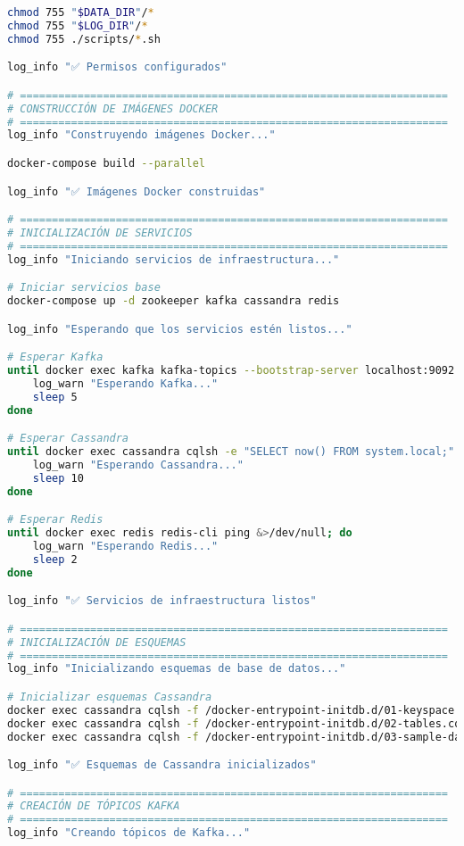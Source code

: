 \begin{lstlisting}[language=bash, caption=Script de Setup Automatizado del Sistema, label=lst:setup_script]
chmod 755 "$DATA_DIR"/*
chmod 755 "$LOG_DIR"/*
chmod 755 ./scripts/*.sh

log_info "✅ Permisos configurados"

# ===================================================================
# CONSTRUCCIÓN DE IMÁGENES DOCKER
# ===================================================================
log_info "Construyendo imágenes Docker..."

docker-compose build --parallel

log_info "✅ Imágenes Docker construidas"

# ===================================================================
# INICIALIZACIÓN DE SERVICIOS
# ===================================================================
log_info "Iniciando servicios de infraestructura..."

# Iniciar servicios base
docker-compose up -d zookeeper kafka cassandra redis

log_info "Esperando que los servicios estén listos..."

# Esperar Kafka
until docker exec kafka kafka-topics --bootstrap-server localhost:9092 --list &>/dev/null; do
    log_warn "Esperando Kafka..."
    sleep 5
done

# Esperar Cassandra
until docker exec cassandra cqlsh -e "SELECT now() FROM system.local;" &>/dev/null; do
    log_warn "Esperando Cassandra..."
    sleep 10
done

# Esperar Redis
until docker exec redis redis-cli ping &>/dev/null; do
    log_warn "Esperando Redis..."
    sleep 2
done

log_info "✅ Servicios de infraestructura listos"

# ===================================================================
# INICIALIZACIÓN DE ESQUEMAS
# ===================================================================
log_info "Inicializando esquemas de base de datos..."

# Inicializar esquemas Cassandra
docker exec cassandra cqlsh -f /docker-entrypoint-initdb.d/01-keyspace.cql
docker exec cassandra cqlsh -f /docker-entrypoint-initdb.d/02-tables.cql
docker exec cassandra cqlsh -f /docker-entrypoint-initdb.d/03-sample-data.cql

log_info "✅ Esquemas de Cassandra inicializados"

# ===================================================================
# CREACIÓN DE TÓPICOS KAFKA
# ===================================================================
log_info "Creando tópicos de Kafka..."


\end{lstlisting}
